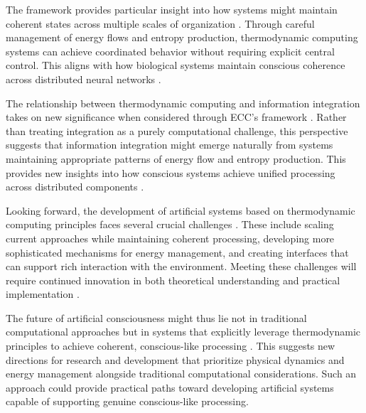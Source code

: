 The framework provides particular insight into how systems might maintain coherent states across multiple scales of organization \cite{Bennett2019}. Through careful management of energy flows and entropy production, thermodynamic computing systems can achieve coordinated behavior without requiring explicit central control. This aligns with how biological systems maintain conscious coherence across distributed neural networks \cite{Boyd2020}.

The relationship between thermodynamic computing and information integration takes on new significance when considered through ECC's framework \cite{England2018}. Rather than treating integration as a purely computational challenge, this perspective suggests that information integration might emerge naturally from systems maintaining appropriate patterns of energy flow and entropy production. This provides new insights into how conscious systems achieve unified processing across distributed components \cite{Ganesh2021}.

Looking forward, the development of artificial systems based on thermodynamic computing principles faces several crucial challenges \cite{Hinrichsen2019}. These include scaling current approaches while maintaining coherent processing, developing more sophisticated mechanisms for energy management, and creating interfaces that can support rich interaction with the environment. Meeting these challenges will require continued innovation in both theoretical understanding and practical implementation \cite{Kolchinsky2020}.

The future of artificial consciousness might thus lie not in traditional computational approaches but in systems that explicitly leverage thermodynamic principles to achieve coherent, conscious-like processing \cite{Maroney2019}. This suggests new directions for research and development that prioritize physical dynamics and energy management alongside traditional computational considerations. Such an approach could provide practical paths toward developing artificial systems capable of supporting genuine conscious-like processing.